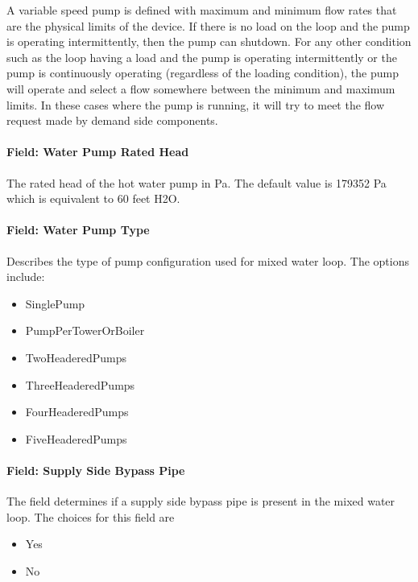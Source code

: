 A variable speed pump is defined with maximum and minimum flow rates that are the physical limits of the device. If there is no load on the loop and the pump is operating intermittently, then the pump can shutdown. For any other condition such as the loop having a load and the pump is operating intermittently or the pump is continuously operating (regardless of the loading condition), the pump will operate and select a flow somewhere between the minimum and maximum limits. In these cases where the pump is running, it will try to meet the flow request made by demand side components.

\paragraph{Field: Water Pump Rated Head}\label{field-water-pump-rated-head}

The rated head of the hot water pump in Pa. The default value is 179352 Pa which is equivalent to 60 feet H2O.

\paragraph{Field: Water Pump Type}\label{field-water-pump-type}

Describes the type of pump configuration used for mixed water loop. The options include:

\begin{itemize}
\item
  SinglePump
\item
  PumpPerTowerOrBoiler
\item
  TwoHeaderedPumps
\item
  ThreeHeaderedPumps
\item
  FourHeaderedPumps
\item
  FiveHeaderedPumps
\end{itemize}

\paragraph{Field: Supply Side Bypass Pipe}\label{field-supply-side-bypass-pipe-1}

The field determines if a supply side bypass pipe is present in the mixed water loop. The choices for this field are

\begin{itemize}
\item
  Yes
\item
  No
\end{itemize}


